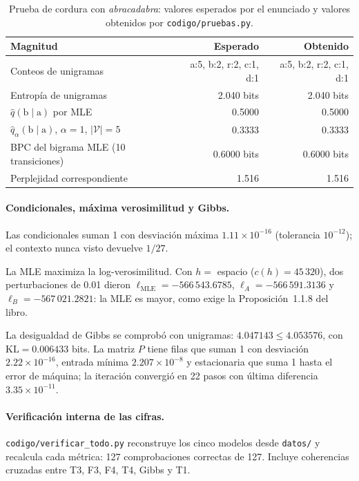 \documentclass[11pt,letterpaper]{article}
\newcommand{\KL}{\text{KL}}
\begin{document}
\begin{table}[htbp]
\centering
\small
\caption{Prueba de cordura con \emph{abracadabra}: valores esperados por el enunciado y valores obtenidos por \texttt{codigo/pruebas.py}.}
\label{tab:cordura}
\begin{tabular}{@{}lrr@{}}
\toprule
\textbf{Magnitud} & \textbf{Esperado} & \textbf{Obtenido}\\
\midrule
Conteos de unigramas & a:5, b:2, r:2, c:1, d:1 & a:5, b:2, r:2, c:1, d:1\\
Entropía de unigramas & 2.040 bits & 2.040 bits\\
$\hat q(\text{b}\mid\text{a})$ por MLE & 0.5000 & 0.5000\\
$\hat q_\alpha(\text{b}\mid\text{a})$, $\alpha=1$, $|\mathcal{V}|=5$ & 0.3333 & 0.3333\\
BPC del bigrama MLE (10 transiciones) & 0.6000 bits & 0.6000 bits\\
Perplejidad correspondiente & 1.516 & 1.516\\
\bottomrule
\end{tabular}
\end{table}

\paragraph{Condicionales, máxima verosimilitud y Gibbs.}

Las condicionales suman 1 con desviación máxima $1.11\times10^{-16}$ (tolerancia $10^{-12}$); el contexto nunca visto devuelve $1/27$.

La MLE maximiza la log-verosimilitud. Con $h=$ espacio ($c(h)=45\,320$), dos perturbaciones de 0.01 dieron $\ell_{\text{MLE}}=-566\,543.6785$, $\ell_A=-566\,591.3136$ y $\ell_B=-567\,021.2821$: la MLE es mayor, como exige la Proposición~1.1.8 del libro.

La desigualdad de Gibbs se comprobó con unigramas: $4.047143\le4.053576$, con $\KL=0.006433$ bits. La matriz $P$ tiene filas que suman 1 con desviación $2.22\times10^{-16}$, entrada mínima $2.207\times10^{-8}$ y estacionaria que suma 1 hasta el error de máquina; la iteración convergió en 22 pasos con última diferencia $3.35\times10^{-11}$.

\paragraph{Verificación interna de las cifras.}

\texttt{codigo/verificar\_todo.py} reconstruye los cinco modelos desde \texttt{datos/} y recalcula cada métrica: 127 comprobaciones correctas de 127. Incluye coherencias cruzadas entre T3, F3, F4, T4, Gibbs y T1.
\end{document}
